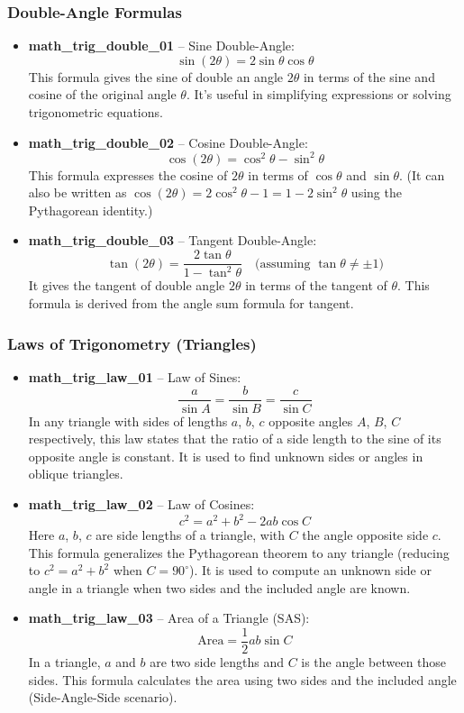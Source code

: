 \documentclass[11pt,a4paper]{article}
\begin{document}
\subsubsection{Double-Angle Formulas}

\begin{itemize}
\item \textbf{math\_trig\_double\_01} -- Sine Double-Angle: 
\[\sin(2\theta) = 2\sin\theta\cos\theta\]
This formula gives the sine of double an angle $2\theta$ in terms of the sine and cosine of the original angle $\theta$. It's useful in simplifying expressions or solving trigonometric equations.

\item \textbf{math\_trig\_double\_02} -- Cosine Double-Angle: 
\[\cos(2\theta) = \cos^2\theta - \sin^2\theta\]
This formula expresses the cosine of $2\theta$ in terms of $\cos\theta$ and $\sin\theta$. (It can also be written as $\cos(2\theta) = 2\cos^2\theta - 1 = 1 - 2\sin^2\theta$ using the Pythagorean identity.)

\item \textbf{math\_trig\_double\_03} -- Tangent Double-Angle: 
\[\tan(2\theta) = \frac{2\tan\theta}{1 - \tan^2\theta} \quad \text{(assuming } \tan\theta \neq \pm 1\text{)}\]
It gives the tangent of double angle $2\theta$ in terms of the tangent of $\theta$. This formula is derived from the angle sum formula for tangent.
\end{itemize}

\subsubsection{Laws of Trigonometry (Triangles)}

\begin{itemize}
\item \textbf{math\_trig\_law\_01} -- Law of Sines: 
\[\frac{a}{\sin A} = \frac{b}{\sin B} = \frac{c}{\sin C}\]
In any triangle with sides of lengths $a$, $b$, $c$ opposite angles $A$, $B$, $C$ respectively, this law states that the ratio of a side length to the sine of its opposite angle is constant. It is used to find unknown sides or angles in oblique triangles.

\item \textbf{math\_trig\_law\_02} -- Law of Cosines: 
\[c^2 = a^2 + b^2 - 2ab\cos C\]
Here $a$, $b$, $c$ are side lengths of a triangle, with $C$ the angle opposite side $c$. This formula generalizes the Pythagorean theorem to any triangle (reducing to $c^2=a^2+b^2$ when $C=90^\circ$). It is used to compute an unknown side or angle in a triangle when two sides and the included angle are known.

\item \textbf{math\_trig\_law\_03} -- Area of a Triangle (SAS): 
\[\text{Area} = \frac{1}{2}ab\sin C\]
In a triangle, $a$ and $b$ are two side lengths and $C$ is the angle between those sides. This formula calculates the area using two sides and the included angle (Side-Angle-Side scenario).
\end{itemize}
\end{document}
